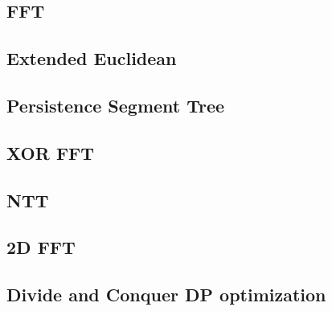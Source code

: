 \documentclass[10pt,landscape,a4paper,twocolumn]{article}
\begin{document}
\subsection{FFT}


%

\subsection{Extended Euclidean}


\subsection{Persistence Segment Tree}


\subsection{XOR FFT}


\subsection{NTT}


\subsection{2D FFT}


\subsection{Divide and Conquer DP optimization}


%
%
%


\end{document}

